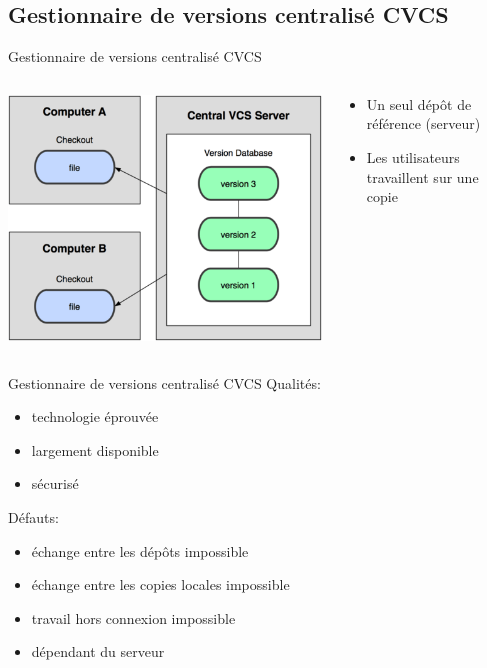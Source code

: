 \subsection{Gestionnaire de versions centralisé CVCS}
\begin{frame}{Gestionnaire de versions centralisé CVCS}
  \begin{columns}[T]

    \begin{column}{.6\textwidth}
      \includegraphics[width=\textwidth]{./CVCS.png}
    \end{column}

    \begin{column}{.4\textwidth}
      \begin{itemize}
        \item{Un seul dépôt de référence (serveur)}
        \item{Les utilisateurs travaillent sur une copie}
      \end{itemize}
    \end{column}

  \end{columns}
\end{frame}

\begin{frame}{Gestionnaire de versions centralisé CVCS}
  Qualités:
  \begin{itemize}
    \item{technologie éprouvée}
    \item{largement disponible}
    \item{sécurisé}
  \end{itemize}

  Défauts:
  \begin{itemize}
    \item{échange entre les dépôts impossible}
    \item{échange entre les copies locales impossible}
    \item{travail hors connexion impossible}
    \item{dépendant du serveur}
  \end{itemize}
\end{frame}

